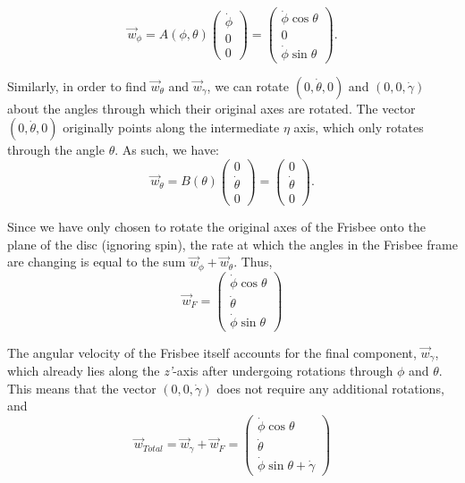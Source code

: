 \documentclass[a4paper,12pt, oneside]{article}
\begin{document}
\begin{equation*}
\vec{w}_\phi=A(\phi,\theta)\left(\begin{array}{ccc}\dot\phi\\0\\0\end{array} \right)=\left(\begin{array}{ccc}\dot\phi\cos\theta\\0\\\dot\phi\sin\theta\end{array} \right).
\end{equation*}

Similarly, in order to find $\vec{w}_\theta$ and $\vec{w}_\gamma$, we can rotate $(0, \dot\theta, 0)$ and $(0, 0, \dot\gamma)$ about the angles through which their original axes are rotated. The vector $(0, \dot\theta, 0)$ originally points along the intermediate $\eta$ axis, which only rotates through the angle $\theta$. As such, we have:
\begin{equation*}
  \vec{w}_\theta=B(\theta)\left(\begin{array}{ccc}
    0\\
    \dot\theta \\
    0
  \end{array} 
  \right)=\left(\begin{array}{ccc}
    0 \\ 
    \dot\theta \\
    0
  \end{array}\right).
\end{equation*}

Since we have only chosen to rotate the original axes of the Frisbee onto the plane of the disc (ignoring spin), the rate at which the angles in the Frisbee frame are changing is equal to the sum $\vec{w}_\phi+\vec{w}_\theta$. Thus,
\begin{equation*}
\vec{w}_F=\left(\begin{array}{ccc}\dot\phi\cos\theta\\\dot\theta\\\dot\phi\sin\theta\end{array} \right)
\end{equation*}

The angular velocity of the Frisbee itself accounts for the final component, $\vec{w}_\gamma$, which already lies along the \textit{z'}-axis after undergoing rotations through $\phi$ and $\theta$. This means that the vector $(0, 0, \dot\gamma)$ does not require any additional rotations, and 
\begin{equation*}
\vec{w}_{Total}=\vec{w}_\gamma+\vec{w}_F=\left(\begin{array}{ccc}\dot\phi\cos\theta\\\dot\theta\\\dot\phi\sin\theta+\dot\gamma\end{array} \right)
\end{equation*}
\end{document}
